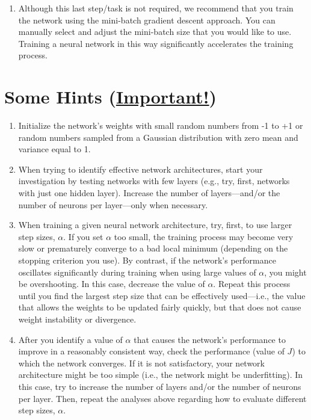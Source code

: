 \documentclass[letterpaper]{article}
\begin{document}
\begin{enumerate}
    \item Although this last step/task is not required, we recommend that you train the network using the mini-batch gradient descent approach. You can manually select and adjust the mini-batch size that you would like to use. Training a neural network in this way significantly accelerates the training process.
    
\end{enumerate}

\section{Some Hints (\underline{Important!})}

\begin{enumerate}
	\item Initialize the network's weights with small random numbers from -1 to +1 or random numbers sampled from a Gaussian distribution with zero mean and variance equal to 1.
	\item When trying to identify effective network architectures, start your investigation by testing networks with few layers (e.g., try, first, networks with just one hidden layer). Increase the number of layers---and/or the number of neurons per layer---only when necessary.
	\item When training a given neural network architecture, try, first, to use larger step sizes, $\alpha$. If you set $\alpha$ too small, the training process may become very slow or prematurely converge to a bad local minimum (depending on the stopping criterion you use). By contrast, if the network's performance oscillates significantly during training when using large values of $\alpha$, you might be overshooting. In this case, decrease the value of $\alpha$. Repeat this process until you find the largest step size that can be effectively used---i.e., the value that allows the weights to be updated fairly quickly, but that does not cause weight instability or divergence.
	\item After you identify a value of $\alpha$ that causes the network's performance to improve in a reasonably consistent way, check the performance (value of $J$) to which the network converges. If it is not satisfactory, your network architecture might be too simple (i.e., the network might be underfitting). In this case, try to increase the number of layers and/or the number of neurons per layer. Then, repeat the analyses above regarding how to evaluate different step sizes, $\alpha$.

\end{enumerate}
\end{document}
